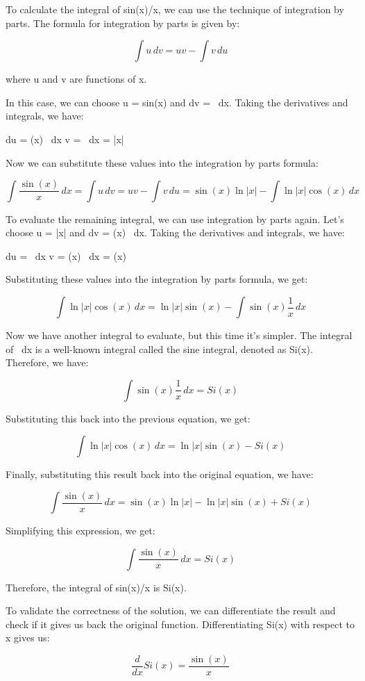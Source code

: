 \documentclass{article}
\begin{document}
To calculate the integral of sin(x)/x, we can use the technique of integration by parts. The formula for integration by parts is given by:

\[
\int u \, dv = uv - \int v \, du
\]

where u and v are functions of x.

In this case, we can choose u = sin(x) and dv =  \, dx. Taking the derivatives and integrals, we have:

du = \cos(x) \, dx
v = \int {} \, dx = \ln|x|

Now we can substitute these values into the integration by parts formula:

\[
\int \frac{\sin(x)}{x} \, dx = \int u \, dv = uv - \int v \, du = \sin(x) \ln|x| - \int \ln|x| \cos(x) \, dx
\]

To evaluate the remaining integral, we can use integration by parts again. Let's choose u = \ln|x| and dv = \cos(x) \, dx. Taking the derivatives and integrals, we have:

du =  \, dx
v = \int \cos(x) \, dx = \sin(x)

Substituting these values into the integration by parts formula, we get:

\[
\int \ln|x| \cos(x) \, dx = \ln|x| \sin(x) - \int \sin(x) \frac{1}{x} \, dx
\]

Now we have another integral to evaluate, but this time it's simpler. The integral of  \, dx is a well-known integral called the sine integral, denoted as Si(x). Therefore, we have:

\[
\int \sin(x) \frac{1}{x} \, dx = Si(x)
\]

Substituting this back into the previous equation, we get:

\[
\int \ln|x| \cos(x) \, dx = \ln|x| \sin(x) - Si(x)
\]

Finally, substituting this result back into the original equation, we have:

\[
\int \frac{\sin(x)}{x} \, dx = \sin(x) \ln|x| - \ln|x| \sin(x) + Si(x)
\]

Simplifying this expression, we get:

\[
\int \frac{\sin(x)}{x} \, dx = Si(x)
\]

Therefore, the integral of sin(x)/x is Si(x).

To validate the correctness of the solution, we can differentiate the result and check if it gives us back the original function. Differentiating Si(x) with respect to x gives us:

\[
\frac{d}{dx} Si(x) = \frac{\sin(x)}{x}
\]
\end{document}
